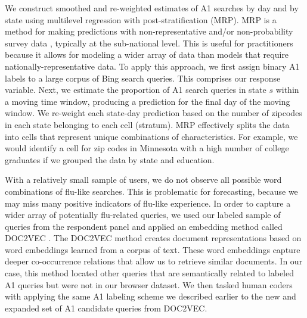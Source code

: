 \documentclass[fleqn,10pt]{wlscirep}
\begin{document}
We construct smoothed and re-weighted estimates of A1 searches by day and by state using multilevel regression with post-stratification (MRP). MRP is a method for making predictions with non-representative and/or non-probability survey data \cite{park_gelman_bafumi_2004}, typically at the sub-national level. This is useful for practitioners because it allows for modeling a wider array of data than models that require nationally-representative data. To apply this approach, we first assign binary A1 labels to a large corpus of Bing search queries. This comprises our response variable. Next, we estimate the proportion of A1 search queries in state $s$ within a moving time window, producing a prediction for the final day of the moving window. We re-weight each state-day prediction based on the number of zipcodes in each state belonging to each cell (stratum). MRP effectively splits the data into cells that represent unique combinations of characteristics. For example, we would identify a cell for zip codes in Minnesota with a high number of college graduates if we grouped the data by state and education.  

With a relatively small sample of users, we do not observe all possible word combinations of flu-like searches. This is problematic for forecasting, because we may miss many positive indicators of flu-like experience. In order to capture a wider array of potentially flu-related queries, we used our labeled sample of queries from the respondent panel and applied an embedding method called DOC2VEC \cite{le_and_mikolov_2014}. The DOC2VEC method creates document representations based on word embeddings learned from a corpus of text. These word embeddings capture deeper co-occurrence relations that allow us to retrieve similar documents. In our case, this method located other queries that are semantically related to labeled A1 queries but were not in our browser dataset. We then tasked human coders with applying the same A1 labeling scheme we described earlier to the new and expanded set of A1 candidate queries from DOC2VEC. 
\end{document}
